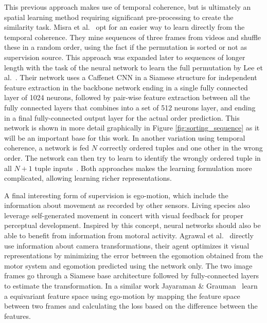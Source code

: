This previous approach makes use of temporal coherence, but is ultimately an spatial learning method requiring significant pre-processing to create the similarity task. Misra et al.~\cite{misra2016} opt for an easier way to learn directly from the temporal coherence. They mine sequences of three frames from videos and shuffle these in a random order, using the fact if the permutation is sorted or not as supervision source. This approach was expanded later to sequences of longer length with the task of the neural network to learn the full permutation by Lee et al.~\cite{lee2017}. Their network uses a Caffenet\cite{jia2014} CNN in a Siamese structure for independent feature extraction in the backbone network ending in a single fully connected layer of 1024 neurons, followed by pair-wise feature extraction between all the fully connected layers that combines into a set of 512 neurons layer, and ending in a final fully-connected output layer for the actual order prediction. This network is shown in more detail graphically in Figure \ref{fig:sorting_sequence} as it will be an important base for this work. In another variation using temporal coherence, a network is fed $N$ correctly ordered tuples and one other in the wrong order. The network can then try to learn to identify the wrongly ordered tuple in all $N+1$ tuple inputs~\cite{fernando2017}. Both approaches makes the learning formulation more complicated, allowing learning richer representations. 

A final interesting form of supervision is ego-motion, which include the information about movement as recorded by other sensors. Living species also leverage self-generated movement in concert with visual feedback for proper perceptual development. Inspired by this concept, neural networks should also be able to benefit from information from motoral activity. Agrawal et al.~\cite{agrawal2015} directly use information about camera transformations, their agent optimizes it visual representations by minimizing the error between the egomotion obtained from the motor system and egomotion predicted using the network only. The two image frames go through a Siamese base architecture followed by fully-connected layers to estimate the transformation. In a similar work Jayaraman \& Grauman~\cite{jayaraman2015} learn a equivariant feature space using ego-motion by mapping the feature space between two frames and calculating the loss based on the difference between the features.

